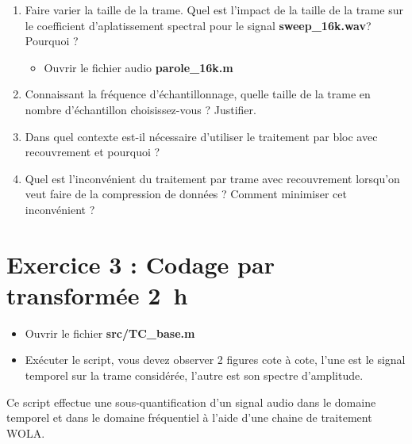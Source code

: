 \documentclass{article}
\begin{document}
\begin{enumerate}[label=\textbf{\arabic*})]
	\item Faire varier la taille de la trame. Quel est l'impact de la taille de la trame sur le coefficient d'aplatissement spectral pour le signal \textbf{sweep\_16k.wav}? Pourquoi ?
	\begin{itemize}
		\item Ouvrir le fichier audio \textbf{parole\_16k.m}
	\end{itemize}
	\item Connaissant la fréquence d’échantillonnage, quelle taille de la trame en nombre d’échantillon choisissez-vous ? Justifier.
	\item Dans quel contexte est-il nécessaire d'utiliser le traitement par bloc avec recouvrement et pourquoi ?
	\item Quel est l’inconvénient du traitement par trame avec recouvrement lorsqu’on veut faire de la compression de données ? Comment minimiser cet inconvénient ?
\end{enumerate}


\section{Exercice 3 : Codage par transformée \small{2~h}}

\begin{itemize}
	\item Ouvrir le fichier \textbf{src/TC\_base.m}
	\item Exécuter le script, vous devez observer 2 figures cote à cote, l'une est le signal temporel sur la trame considérée, l'autre est son spectre d'amplitude.
\end{itemize}

Ce script effectue une sous-quantification d'un signal audio dans le domaine temporel et dans le domaine fréquentiel à l'aide d'une chaine de traitement WOLA.
\end{document}
